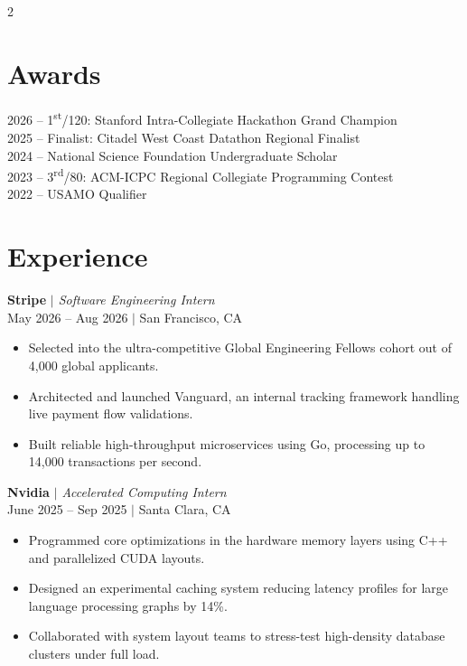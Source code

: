 \documentclass[letterpaper,10pt]{article}
\newcommand{\descript}[1]{{\color{subheadings}\textit{\small #1}}}
\newcommand{\location}[1]{{\color{graytext}\footnotesize #1}}
\newcommand{\runsubsection}[1]{{\color{subheadings}\bfseries\large #1}}
\newcommand{\sectionsep}{\vspace{3pt}}
\newenvironment{tightemize}{
  \begin{itemize}[leftmargin=3mm, topsep=1pt, itemsep=2pt, parsep=0pt]
}{
  \end{itemize}
}
\begin{document}
\begin{paracol}{2}
\section{Awards}
{\small
2026 -- 1\textsuperscript{st}/120: Stanford Intra-Collegiate Hackathon Grand Champion \\
2025 -- Finalist: Citadel West Coast Datathon Regional Finalist \\
2024 -- National Science Foundation Undergraduate Scholar \\
2023 -- 3\textsuperscript{rd}/80: ACM-ICPC Regional Collegiate Programming Contest \\
2022 -- USAMO Qualifier
}
\sectionsep

\switchcolumn %

\section{Experience}

\runsubsection{Stripe} \descript{$|$ Software Engineering Intern} \\
\location{May 2026 -- Aug 2026 $|$ San Francisco, CA}
\begin{tightemize}
    \item Selected into the ultra-competitive Global Engineering Fellows cohort out of 4,000 global applicants.
    \item Architected and launched Vanguard, an internal tracking framework handling live payment flow validations.
    \item Built reliable high-throughput microservices using Go, processing up to 14,000 transactions per second.
\end{tightemize}
\sectionsep

\runsubsection{Nvidia} \descript{$|$ Accelerated Computing Intern} \\
\location{June 2025 -- Sep 2025 $|$ Santa Clara, CA}
\begin{tightemize}
    \item Programmed core optimizations in the hardware memory layers using C++ and parallelized CUDA layouts.
    \item Designed an experimental caching system reducing latency profiles for large language processing graphs by 14\%.
    \item Collaborated with system layout teams to stress-test high-density database clusters under full load.
\end{tightemize}
\sectionsep


\end{paracol}
\end{document}
